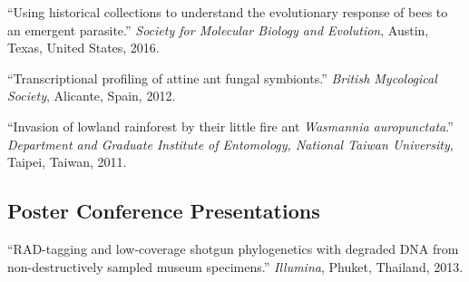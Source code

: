 \documentclass[11pt]{article}
\def\printdate#1{\xprintdate#1-}
\def\xprintdate#1-#2-#3-{#1}
\begin{document}
\ind ``Using historical collections to understand the evolutionary response of
bees to an emergent parasite.'' \emph{Society for Molecular Biology and Evolution}, Austin, Texas, United States, \printdate{2016-00-00}.




























\ind ``Transcriptional profiling of attine ant fungal symbionts.'' \emph{British Mycological Society}, Alicante, Spain, \printdate{2012-00-00}.


\ind ``Invasion of lowland rainforest by their little fire ant
\textit{Wasmannia auropunctata}.'' \emph{Department and Graduate Institute of Entomology, National Taiwan
University}, Taipei, Taiwan, \printdate{2011-00-00}.








\subsection{Poster Conference Presentations}





























\ind ``RAD-tagging and low-coverage shotgun phylogenetics with degraded DNA
from non-destructively sampled museum specimens.'' \emph{Illumina}, Phuket, Thailand, \printdate{2013-00-00}.
\end{document}
